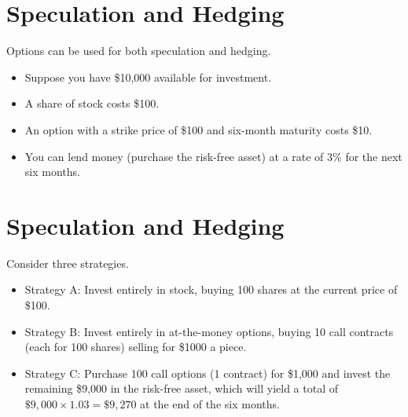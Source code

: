 \documentclass[letterpaper,10pt,english]{sphinxmanual}
\begin{document}
\section{Speculation and Hedging}
\label{options:speculation-and-hedging}
Options can be used for both speculation and hedging.
\begin{itemize}
\item {} 
Suppose you have \$10,000 available for investment.

\end{itemize}
\begin{itemize}
\item {} 
A share of stock costs \$100.

\end{itemize}
\begin{itemize}
\item {} 
An option with a strike price of \$100 and six-month maturity costs
\$10.

\end{itemize}
\begin{itemize}
\item {} 
You can lend money (purchase the risk-free asset) at a rate of 3\%
for the next six months.

\end{itemize}


\section{Speculation and Hedging}
\label{options:id12}
Consider three strategies.
\begin{itemize}
\item {} 
Strategy A: Invest entirely in stock, buying 100 shares at the
current price of \$100.

\end{itemize}
\begin{itemize}
\item {} 
Strategy B: Invest entirely in at-the-money options, buying 10 call
contracts (each for 100 shares) selling for \$1000 a piece.

\end{itemize}
\begin{itemize}
\item {} 
Strategy C: Purchase 100 call options (1 contract) for \$1,000 and
invest the remaining \$9,000 in the risk-free asset, which will
yield a total of $\$9,000\times1.03 = \$9,270$ at the
end of the six months.

\end{itemize}
\end{document}
